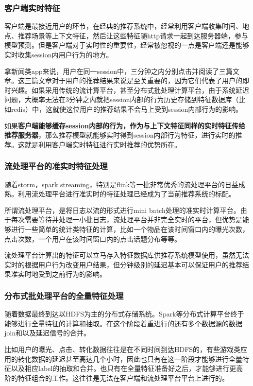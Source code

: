 \documentclass[12pt]{article}
\begin{document}
\subsubsection{客户端实时特征}
客户端是最接近用户的环节，在经典的推荐系统中，经常利用客户端收集时间、地点、推荐场景等上下文特征，然后让这些特征随http请求一起到达服务器端，参与模型预测。但是客户端对于实时性的重要性，经常被忽视的一点是客户端还是能够实时收集session内用户行为的地方。

拿新闻类app来说，用户在同一session中，三分钟之内分别点击并阅读了三篇文章。这三篇文章对于用户的推荐结果来说是至关重要的，因为它们代表了用户的即时兴趣。如果采用传统的流计算平台，甚至分布式批处理计算平台，由于系统延迟问题，大概率无法在3分钟之内就把session内部的行为历史存储到特征数据库（比如redis）中，这就使这位用户的推荐结果不会马上受到session内部行为的影响。

如果\textbf{客户端能够缓存session内部的行为，作为与上下文特征同样的实时特征传给推荐服务器}，那么推荐模型就能够实时得到session内部行为特征，进行实时的推荐。这就是利用客户端实时特征进行实时推荐的优势所在。

\subsubsection{流处理平台的准实时特征处理}
随着storm，spark streaming，特别是flink等一批非常优秀的流处理平台的日益成熟。利用流处理平台进行准实时的特征处理已经成为了当前推荐系统的标配。

所谓流处理平台，是将日志以流的形式进行mini batch处理的准实时计算平台。由于每次需要等待并处理一小批日志，流处理平台并非完全实时的平台，但优势是能够进行一些简单的统计类特征的计算，比如一个物品在该时间窗口内的曝光次数，点击次数，一个用户在该时间窗口内的点击话题分布等等。

流处理平台计算出的特征可以立马存入特征数据库供推荐系统模型使用，虽然无法实时的根据用户行为改变用户结果，但分钟级别的延迟基本可以保证用户的推荐结果准实时地受到之前行为的影响。

\subsubsection{分布式批处理平台的全量特征处理}
随着数据最终到达以HDFS为主的分布式存储系统。Spark等分布式计算平台终于能够进行全量特征的计算和抽取。在这个阶段着重进行的还有多个数据源的数据join和以及延迟信号的合并。

比如用户的曝光、点击、转化数据往往是在不同时间到达HDFS的，有些游戏类应用的转化数据的延迟甚至高达几个小时，因此也只有在这一阶段才能够进行全量特征以及相应label的抽取和合并。也只有在全量特征准备好之后，才能够进行更高阶的特征组合的工作。这往往是无法在客户端和流处理平台平台上进行的。
\end{document}
